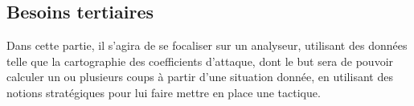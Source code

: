 \documentclass[a4paper]{report}
\begin{document}
\begin{enumerate}
  
  
  
  

\end{enumerate}


\subsection{Besoins tertiaires} %
Dans cette partie, il s'agira de se focaliser sur un analyseur, utilisant des données telle que la cartographie des coefficients d'attaque, dont le but sera de pouvoir calculer un ou plusieurs coups à partir d'une situation donnée, en utilisant des notions stratégiques \cite{AI2009} pour lui faire mettre en place une tactique.
\newline 
\end{document}
